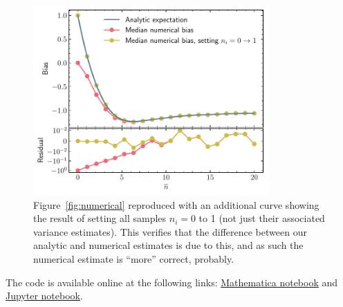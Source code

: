 \documentclass{article}
\begin{document}
\begin{figure}
	\begin{center}
		\includegraphics[width=0.8\textwidth]{figures/difference_explanation.pdf}
	\end{center}
	\caption{%
		Figure~\ref{fig:numerical} reproduced with an additional curve
		showing the result of setting all samples $n_i = 0$ to 1 (not
		just their associated variance estimates). This verifies that 
		the difference between our analytic and numerical estimates is
		due to this, and as such the numerical estimate is ``more''
		correct, probably.
	}
	\label{fig:difference}
\end{figure}

The code is available online at the following links: \href{https://github.com/cmhainje/exgal-hw/blob/main/hw3/series.nb}{Mathematica notebook}
and \href{https://github.com/cmhainje/exgal-hw/blob/main/hw3/numerics.ipynb}{Jupyter notebook}.
\end{document}
